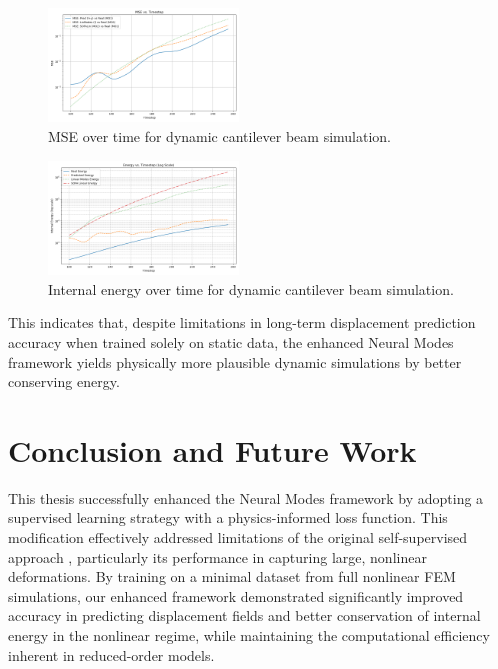 \documentclass[11pt,a4paper,twocolumn]{article}
\begin{document}
\begin{figure}[H]
    \centering
    \includegraphics[width=0.45\textwidth]{Images/beam_dynamic_mse.png}
    \caption{MSE over time for dynamic cantilever beam simulation.}
    \label{fig:dynamic_validation_mse_comparison}
\end{figure}

\begin{figure}[htb]
    \centering
    \includegraphics[width=0.45\textwidth]{Images/beam_dynamic_energy.png}
    \caption{Internal energy over time for dynamic cantilever beam simulation.}
    \label{fig:dynamic_validation_energy_comparison}
\end{figure}

This indicates that, despite limitations in long-term displacement prediction accuracy when trained solely on static data, the enhanced Neural Modes framework yields physically more plausible dynamic simulations by better conserving energy.

\section{Conclusion and Future Work}
\label{sec:es:conclusion}

This thesis successfully enhanced the Neural Modes framework by adopting a supervised learning strategy with a physics-informed loss function. This modification effectively addressed limitations of the original self-supervised approach \cite{Wang_Du_Coros_Thomaszewski_2024}, particularly its performance in capturing large, nonlinear deformations. By training on a minimal dataset from full nonlinear FEM simulations, our enhanced framework demonstrated significantly improved accuracy in predicting displacement fields and better conservation of internal energy in the nonlinear regime, while maintaining the computational efficiency inherent in reduced-order models.
\end{document}
